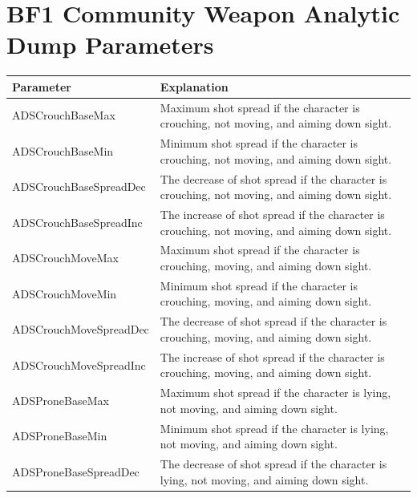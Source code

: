 \documentclass[MGS,Master,english]{twbook}%
\begin{document}
\chapter{\acl{BF1} Community Weapon Analytic Dump Parameters} \label{bf1::dumpParams}
\begin{longtable}[c]{|l|p{10.5cm}|}
	\hline
	\textbf{Parameter}     & \textbf{Explanation}                                                                                                           \\ \hline
	\endhead
	ADSCrouchBaseMax       & Maximum shot spread if the character is crouching, not moving, and aiming down sight.                                          \\ \hline
	ADSCrouchBaseMin       & Minimum shot spread if the character is crouching, not moving, and aiming down sight.                                          \\ \hline
	ADSCrouchBaseSpreadDec & The decrease of shot spread if the character is crouching, not moving, and aiming down sight.                                  \\ \hline
	ADSCrouchBaseSpreadInc & The increase of shot spread if the character is crouching, not moving, and aiming down sight.                                  \\ \hline
	ADSCrouchMoveMax       & Maximum shot spread if the character is crouching, moving, and aiming down sight.                                              \\ \hline
	ADSCrouchMoveMin       & Minimum shot spread if the character is crouching, moving, and aiming down sight.                                              \\ \hline
	ADSCrouchMoveSpreadDec & The decrease of shot spread if the character is crouching, moving, and aiming down sight.                                      \\ \hline
	ADSCrouchMoveSpreadInc & The increase of shot spread if the character is crouching, moving, and aiming down sight.                                      \\ \hline
	ADSProneBaseMax        & Maximum shot spread if the character is lying, not moving, and aiming down sight.                                              \\ \hline
	ADSProneBaseMin        & Minimum shot spread if the character is lying, not moving, and aiming down sight.                                              \\ \hline
	ADSProneBaseSpreadDec  & The decrease of shot spread if the character is lying, not moving, and aiming down sight.                                      \\ \hline

\end{longtable}
\end{document}
